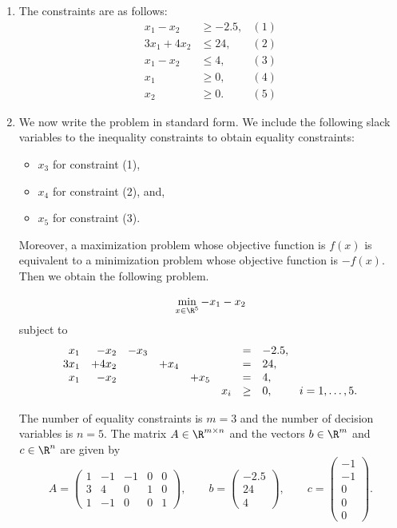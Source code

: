 \begin{enumerate}
\item The constraints are as follows:
  \begin{align*}
    x_1 -x_2 &\geq -2.5, &(1)\\
    3x_1 + 4x_2 &\leq 24, & (2) \\
    x_1 - x_2 &\leq 4, & (3) \\
    x_1 &\geq 0, & (4) \\
    x_2 &\geq 0. & (5)
  \end{align*}

\item  We now write the problem in  standard form. We include the
  following  slack variables to the inequality constraints to obtain
  equality constraints:
  \begin{itemize}
  \item $x_3$ for constraint (1),
  \item $x_4$ for constraint (2), and,
  \item $x_5$ for constraint (3).
  \end{itemize}
  Moreover, a maximization problem whose objective function is $f(x)$ is equivalent to a minimization problem
  whose objective function is $-f(x)$. Then we obtain the following problem.

  \[
    \min_{x \in \R^5}  -x_1  -x_2
    \]
    subject to
  \[
  \begin{array}{rrrrrr cl r}
     x_1 &  - x_2 &  - x_3 & & & &= & -2.5, & \\
     3 x_1 & +4 x_2 & &  + x_4 & & &= & 24, & \\
     x_1 & - x_2 & & &  + x_5 & &= & 4, & \\
     & & & & &  x_i & \geq & 0, &  i = 1,\ldots, 5.
  \end{array}
  \]

  The number of equality constraints is $m=3$ and the number of decision variables is $n=5$.
  The matrix  $A\in\R^{m\times n}$ and the vectors $b\in\R^{m}$ and $c\in\R^{n}$ are given by
  \[
  A =
  \begin{pmatrix}
    1 & -1 & -1 & 0 & 0 \\
    3 & 4 & 0 & 1 & 0\\
    1 & -1 & 0 & 0 & 1
  \end{pmatrix}, \qquad
  b = \begin{pmatrix}
    -2.5 \\
    24 \\
    4
  \end{pmatrix}, \qquad
  c = \begin{pmatrix}
    -1 \\
    -1 \\
    0 \\
    0 \\
    0
  \end{pmatrix}.
  \]


\end{enumerate}
